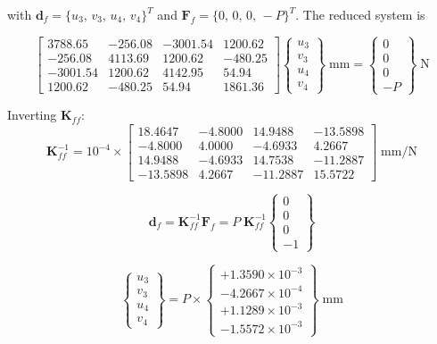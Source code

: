 \documentclass[11pt, a4paper]{article}
\begin{document}
with $\mathbf{d}_f=\{u_3,\,v_3,\,u_4,\,v_4\}^T$ and $\mathbf{F}_f=\{0,\,0,\,0,\,-P\}^T$.  The reduced system is

\[
\begin{bmatrix}
 3788.65 &  -256.08 & -3001.54 &  1200.62 \\
 -256.08 &  4113.69 &  1200.62 &  -480.25 \\
-3001.54 &  1200.62 &  4142.95 &    54.94 \\
 1200.62 &  -480.25 &    54.94 &  1861.36
\end{bmatrix}
\begin{Bmatrix} u_3 \\ v_3 \\ u_4 \\ v_4 \end{Bmatrix}\;\text{mm}
=
\begin{Bmatrix} 0 \\ 0 \\ 0 \\ -P \end{Bmatrix}\;\text{N}
\]

Inverting $\mathbf{K}_{ff}$:
\[
\mathbf{K}_{ff}^{-1} = 10^{-4}\!\times\!
\begin{bmatrix}
 18.4647 & -4.8000 &  14.9488 & -13.5898 \\
 -4.8000 &  4.0000 &  -4.6933 &   4.2667 \\
 14.9488 & -4.6933 &  14.7538 & -11.2887 \\
-13.5898 &  4.2667 & -11.2887 &  15.5722
\end{bmatrix}
\;\text{mm/N}
\]

\[
\mathbf{d}_f = \mathbf{K}_{ff}^{-1}\mathbf{F}_f
= P\;\mathbf{K}_{ff}^{-1}
\begin{Bmatrix} 0 \\ 0 \\ 0 \\ -1 \end{Bmatrix}
\]

\begin{equation}\label{eq:disp}
\boxed{
\begin{Bmatrix} u_3 \\ v_3 \\ u_4 \\ v_4 \end{Bmatrix}
= P \times
\begin{Bmatrix}
+1.3590 \times 10^{-3} \\
-4.2667 \times 10^{-4} \\
+1.1289 \times 10^{-3} \\
-1.5572 \times 10^{-3}
\end{Bmatrix}
\;\text{mm}
}
\end{equation}
\end{document}
